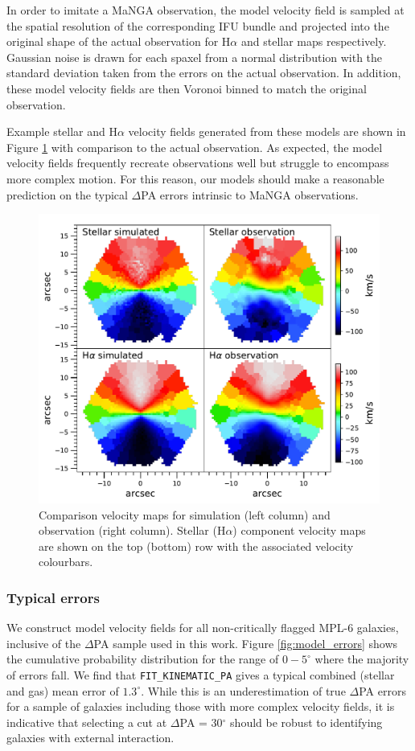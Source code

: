 In order to imitate a MaNGA observation, the model velocity field is sampled at the spatial resolution of the corresponding IFU bundle and projected into the original shape of the actual observation for H$\alpha$ and stellar maps respectively. Gaussian noise is drawn for each spaxel from a normal distribution with the standard deviation taken from the errors on the actual observation. In addition, these model velocity fields are then Voronoi binned to match the original observation.

Example stellar and H$\alpha$ velocity fields generated from these models are shown in Figure \ref{fig:sim_ifu} with comparison to the actual observation. As expected, the model velocity fields frequently recreate observations well but struggle to encompass more complex motion. For this reason, our models should make a reasonable prediction on the typical $\Delta$PA errors intrinsic to MaNGA observations.

\begin{figure}
    \centering
	\includegraphics[width=0.7\linewidth]{thesis/latex/misalignment_intro/obs_sim_IFU.pdf}
    \caption[Comparison velocity maps for simulation (left column) and observation (right column).]{Comparison velocity maps for simulation (left column) and observation (right column). Stellar (H$\alpha$) component velocity maps are shown on the top (bottom) row with the associated velocity colourbars.}
    \label{fig:sim_ifu}
\end{figure}

\subsubsection{Typical errors}
We construct model velocity fields for all non-critically flagged MPL-6 galaxies, inclusive of the $\Delta$PA sample used in this work. Figure \ref{fig:model_errors} shows the cumulative probability distribution for the range of $0-5^{\circ}$ where the majority of errors fall. We find that \texttt{FIT\_KINEMATIC\_PA} gives a typical combined (stellar and gas) mean error of $1.3^{\circ}$. While this is an underestimation of true $\Delta$PA errors for a sample of galaxies including those with more complex velocity fields, it is indicative that selecting a cut at $\Delta$PA = 30$^{\circ}$ should be robust to identifying galaxies with external interaction. 

